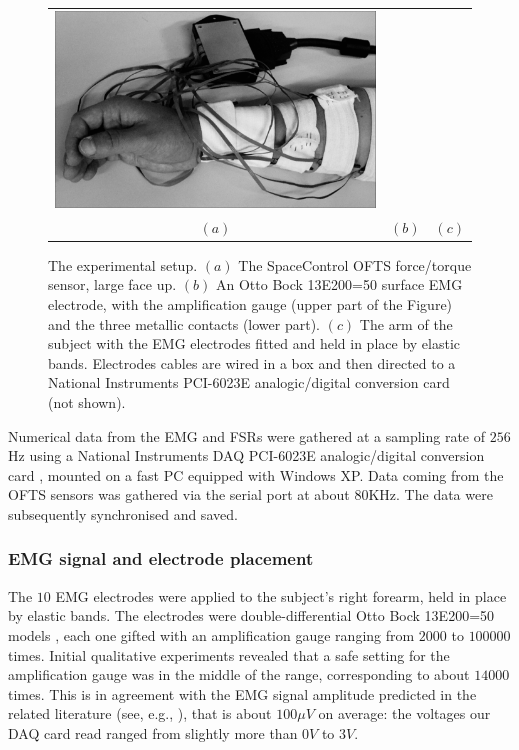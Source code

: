 \begin{figure}[!ht]
\begin{tabular}{ccc}
    \includegraphics[height=0.16\textheight]{figs/setup} \\
    $(a)$ & $(b)$ & $(c)$ \\
  \end{tabular}
  \caption{The experimental setup. $(a)$ The SpaceControl OFTS
    force/torque sensor, large face up. $(b)$ An Otto Bock 13E200=50
    surface EMG electrode, with the amplification gauge (upper part of
    the Figure) and the three metallic contacts (lower part). $(c)$
    The arm of the subject with the EMG electrodes fitted and held in
    place by elastic bands. Electrodes cables are wired in a box and
    then directed to a National Instruments PCI-6023E analogic/digital
    conversion card (not shown).}
  \label{fig:setup}
\end{figure}

Numerical data from the EMG and FSRs were gathered at a sampling rate
of $256$Hz using a National Instruments DAQ PCI-6023E analogic/digital
conversion card \cite{...}, mounted on a fast PC equipped with Windows
XP. Data coming from the OFTS sensors was gathered via the serial port
at about $80$KHz. The data were subsequently synchronised and saved.

\subsubsection{EMG signal and electrode placement}

The $10$ EMG electrodes were applied to the subject's right forearm,
held in place by elastic bands. The electrodes were
double-differential Otto Bock 13E200=50 models \cite{...}, each one
gifted with an amplification gauge ranging from $2000$ to $100000$
times. Initial qualitative experiments revealed that a safe setting
for the amplification gauge was in the middle of the range,
corresponding to about $14000$ times. This is in agreement with the
EMG signal amplitude predicted in the related literature (see, e.g.,
\cite{deluca}), that is about $100 \mu V$ on average: the voltages our
DAQ card read ranged from slightly more than $0V$ to $3V$.

